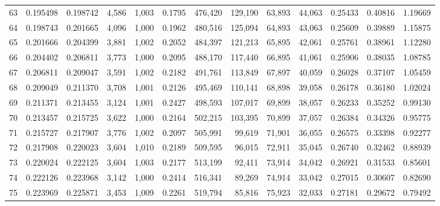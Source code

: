 \begin{tabular}{rrrrrrrrrrrrr}
63  &  0.195498 &  0.198742 &   4,586 &  1,003 &                                     0.1795 &  476,420 &  129,190 &   63,893 &   44,063 &  0.25433 &  0.40816 &  1.19669 \\
64  &  0.198743 &  0.201665 &   4,096 &  1,000 &                                     0.1962 &  480,516 &  125,094 &   64,893 &   43,063 &  0.25609 &  0.39889 &  1.15875 \\
65  &  0.201666 &  0.204399 &   3,881 &  1,002 &                                     0.2052 &  484,397 &  121,213 &   65,895 &   42,061 &  0.25761 &  0.38961 &  1.12280 \\
66  &  0.204402 &  0.206811 &   3,773 &  1,000 &                                     0.2095 &  488,170 &  117,440 &   66,895 &   41,061 &  0.25906 &  0.38035 &  1.08785 \\
67  &  0.206811 &  0.209047 &   3,591 &  1,002 &                                     0.2182 &  491,761 &  113,849 &   67,897 &   40,059 &  0.26028 &  0.37107 &  1.05459 \\
68  &  0.209049 &  0.211370 &   3,708 &  1,001 &                                     0.2126 &  495,469 &  110,141 &   68,898 &   39,058 &  0.26178 &  0.36180 &  1.02024 \\
69  &  0.211371 &  0.213455 &   3,124 &  1,001 &                                     0.2427 &  498,593 &  107,017 &   69,899 &   38,057 &  0.26233 &  0.35252 &  0.99130 \\
70  &  0.213457 &  0.215725 &   3,622 &  1,000 &                                     0.2164 &  502,215 &  103,395 &   70,899 &   37,057 &  0.26384 &  0.34326 &  0.95775 \\
71  &  0.215727 &  0.217907 &   3,776 &  1,002 &                                     0.2097 &  505,991 &   99,619 &   71,901 &   36,055 &  0.26575 &  0.33398 &  0.92277 \\
72  &  0.217908 &  0.220023 &   3,604 &  1,010 &                                     0.2189 &  509,595 &   96,015 &   72,911 &   35,045 &  0.26740 &  0.32462 &  0.88939 \\
73  &  0.220024 &  0.222125 &   3,604 &  1,003 &                                     0.2177 &  513,199 &   92,411 &   73,914 &   34,042 &  0.26921 &  0.31533 &  0.85601 \\
74  &  0.222126 &  0.223968 &   3,142 &  1,000 &                                     0.2414 &  516,341 &   89,269 &   74,914 &   33,042 &  0.27015 &  0.30607 &  0.82690 \\
75  &  0.223969 &  0.225871 &   3,453 &  1,009 &                                     0.2261 &  519,794 &   85,816 &   75,923 &   32,033 &  0.27181 &  0.29672 &  0.79492 \\

\end{tabular}
